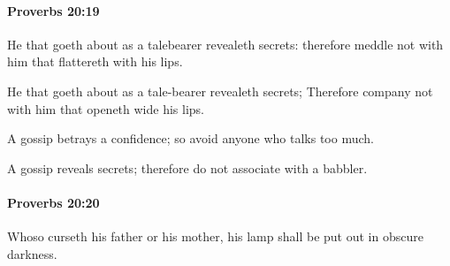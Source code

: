 		\paragraph{Proverbs 20:19} %
			\label{PROVERBS-20-19}

			He that goeth about as a talebearer revealeth secrets: therefore meddle not with him that flattereth with his lips.

			\begin{versebox}
					\item[BHS] 
					\item[ASV] He that goeth about as a tale-bearer revealeth secrets; Therefore company not with him that openeth wide his lips.
					\item[NIV] A gossip betrays a confidence; so avoid anyone who talks too much.
					\item[NRSV] A gossip reveals secrets; therefore do not associate with a babbler.
			\end{versebox}

		\paragraph{Proverbs 20:20} %
			\label{PROVERBS-20-20}

			Whoso curseth his father or his mother, his lamp shall be put out in obscure darkness.

